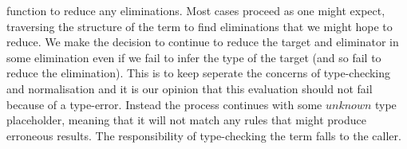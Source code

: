function to reduce any eliminations. Most cases proceed as one might expect,
traversing the structure of the term to find eliminations that we might hope to
reduce. We make the decision to continue to reduce the target and eliminator in
some elimination even if we fail to infer the type of the target (and so fail to
reduce the elimination). This is to keep seperate the concerns of type-checking
and normalisation and it is our opinion that this evaluation should not fail
because of a type-error. Instead the process continues with some $unknown$ type
placeholder, meaning that it will not match any rules that might produce erroneous
results. The responsibility of type-checking the term falls to the caller.

